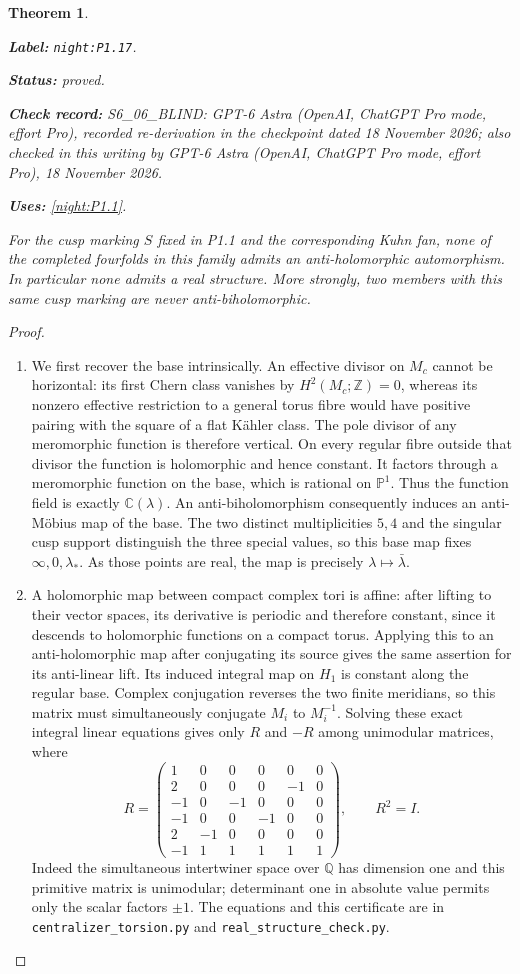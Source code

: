 \documentclass[11pt,a4paper]{article}
\newtheorem{theorem}{Theorem}[section]
\theoremstyle{definition}
\newcommand{\StatementRecord}[4]{\par\smallskip\begingroup\upshape\raggedright\noindent\textbf{Label:} \nolinkurl{#1}.\par\noindent\textbf{Status:} #2.\par\noindent\textbf{Check record:} #3.\par\noindent\textbf{Uses:} #4.\par\endgroup\smallskip}
\newcommand{\CurrentChecker}{GPT-6 Astra (OpenAI, ChatGPT Pro mode, effort Pro), 18 November 2026}
\begin{document}
\begin{theorem}\label{night:P1.17}
\StatementRecord{night:P1.17}{proved}{S6\_06\_BLIND: GPT-6 Astra (OpenAI, ChatGPT Pro mode, effort Pro), recorded re-derivation in the checkpoint dated 18 November 2026; also checked in this writing by \CurrentChecker}{\cref{night:P1.1}}
For the cusp marking $S$ fixed in P1.1 and the corresponding Kuhn fan,
none of the completed fourfolds in this family admits an
anti-holomorphic automorphism.  In particular none admits a real
structure.  More strongly, two members with this same cusp marking
are never anti-biholomorphic.
\end{theorem}
\begin{proof}
\begin{enumerate}[label=\arabic*.]
\item We first recover the base intrinsically.  An effective divisor on
$M_c$ cannot be horizontal: its first Chern class vanishes by
$H^2(M_c;\mathbb Z)=0$, whereas its nonzero effective restriction to a
general torus fibre would have positive pairing with the square of a
flat K\"ahler class.  The pole divisor of any meromorphic function is
therefore vertical.  On every regular fibre outside that divisor the
function is holomorphic and hence constant.  It factors through a
meromorphic function on the base, which is rational on
$\mathbb P^1$.  Thus the function field is exactly $\mathbb C(\lambda)$.
An anti-biholomorphism consequently induces an anti-M\"obius map of
the base.  The two distinct multiplicities $5,4$ and the singular cusp
support distinguish the three special values, so this base map fixes
$\infty,0,\lambda_*$.  As those points are real, the map is precisely
$\lambda\mapsto\bar\lambda$.

\item A holomorphic map between compact complex tori is affine: after
lifting to their vector spaces, its derivative is periodic and
therefore constant, since it descends to holomorphic functions on a
compact torus.  Applying this to an anti-holomorphic map after
conjugating its source gives the same assertion for its anti-linear
lift.  Its induced integral map on $H_1$ is constant along the
regular base.  Complex conjugation reverses the two finite meridians,
so this matrix must simultaneously conjugate $M_i$ to $M_i^{-1}$.
Solving these exact integral linear equations gives only $R$ and
$-R$ among unimodular matrices, where
\[
R=\begin{pmatrix}
1&0&0&0&0&0\\
2&0&0&0&-1&0\\
-1&0&-1&0&0&0\\
-1&0&0&-1&0&0\\
2&-1&0&0&0&0\\
-1&1&1&1&1&1
\end{pmatrix},\qquad R^2=I.
\]
Indeed the simultaneous intertwiner space over $\mathbb Q$ has
dimension one and this primitive matrix is unimodular; determinant
one in absolute value permits only the scalar factors $\pm1$.
The equations and this certificate are in
\texttt{centralizer\_torsion.py} and
\texttt{real\_structure\_check.py}.


\end{enumerate}
\end{proof}
\end{document}
